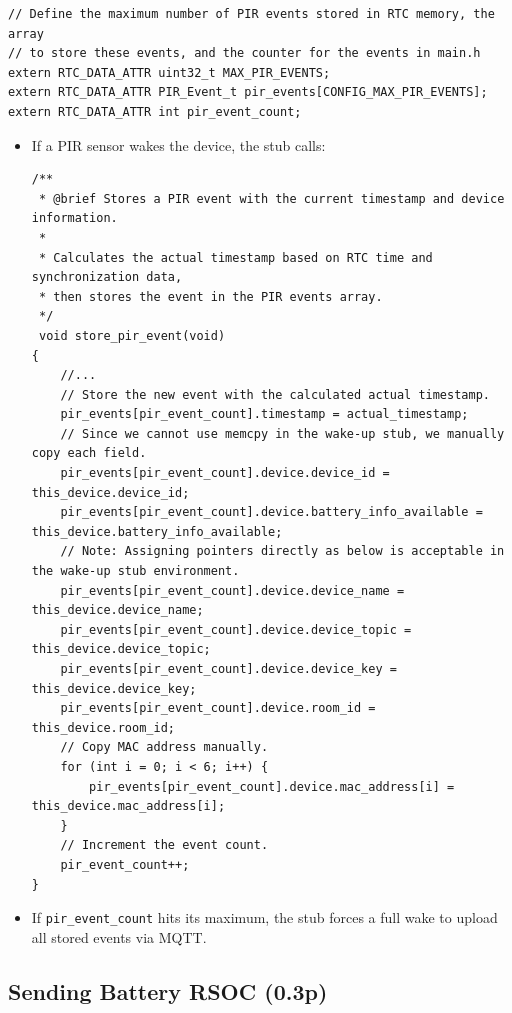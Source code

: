 \documentclass[A4,10pt]{article}
\begin{document}
\begin{itemize}
\begin{verbatim}
// Define the maximum number of PIR events stored in RTC memory, the array 
// to store these events, and the counter for the events in main.h
extern RTC_DATA_ATTR uint32_t MAX_PIR_EVENTS;
extern RTC_DATA_ATTR PIR_Event_t pir_events[CONFIG_MAX_PIR_EVENTS];
extern RTC_DATA_ATTR int pir_event_count;
	\end{verbatim}
    \begin{itemize}
        \item If a PIR sensor wakes the device, the stub calls:
\begin{verbatim}
/**
 * @brief Stores a PIR event with the current timestamp and device information.
 *
 * Calculates the actual timestamp based on RTC time and synchronization data,
 * then stores the event in the PIR events array.
 */
 void store_pir_event(void)
{
	//...
    // Store the new event with the calculated actual timestamp.
    pir_events[pir_event_count].timestamp = actual_timestamp;
    // Since we cannot use memcpy in the wake-up stub, we manually copy each field.
    pir_events[pir_event_count].device.device_id = this_device.device_id;
    pir_events[pir_event_count].device.battery_info_available = this_device.battery_info_available;
    // Note: Assigning pointers directly as below is acceptable in the wake-up stub environment.
    pir_events[pir_event_count].device.device_name = this_device.device_name;
    pir_events[pir_event_count].device.device_topic = this_device.device_topic;
    pir_events[pir_event_count].device.device_key = this_device.device_key;
    pir_events[pir_event_count].device.room_id = this_device.room_id;
    // Copy MAC address manually.
    for (int i = 0; i < 6; i++) {
        pir_events[pir_event_count].device.mac_address[i] = this_device.mac_address[i];
    }
    // Increment the event count.
    pir_event_count++;
}
\end{verbatim}
        \item If \texttt{pir\_event\_count} hits its maximum, the stub forces a full wake to upload all stored events via MQTT.
    \end{itemize}
\end{itemize}

\subsection{Sending Battery RSOC (0.3p)}
\label{sec:battery_rsoc}
\end{document}
